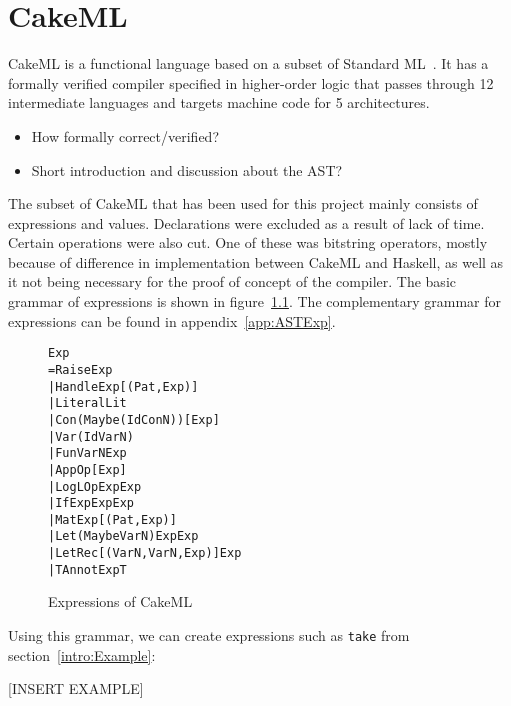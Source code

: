 \chapter{CakeML}

CakeML is a functional language based on a subset of
Standard ML~\cite{CakeML25:online}. It has a
formally verified compiler specified in higher-order logic that passes through
12 intermediate languages and targets machine code for 5 architectures.

\begin{itemize}
\item How formally correct/verified?
\item Short introduction and discussion about the AST?
\end{itemize}

The subset of CakeML that has been used for this project mainly
consists of expressions and values. Declarations were excluded as a result of
lack of time. Certain operations were also cut. One of these was bitstring
operators, mostly because of difference in implementation between CakeML
and Haskell, as well as it not being necessary for the proof of concept of
the compiler.
The basic grammar of expressions is shown in figure~\ref{CakeExp}. The
complementary grammar for expressions can be found in appendix~\ref{app:ASTExp}.

\begin{figure}
\begin{alltt}
Exp
  = Raise Exp
  | Handle Exp [(Pat, Exp)]
  | Literal Lit
  | Con (Maybe (Id ConN)) [Exp]
  | Var (Id VarN)
  | Fun VarN Exp
  | App Op [Exp]
  | Log LOp Exp Exp
  | If Exp Exp Exp
  | Mat Exp [(Pat, Exp)]
  | Let (Maybe VarN) Exp Exp
  | LetRec [(VarN, VarN, Exp)] Exp
  | TAnnot Exp T
\end{alltt}
\caption{Expressions of CakeML}
\label{CakeExp}
\end{figure}

\noindent Using this grammar, we can create expressions such as \texttt{take} from
section~\ref{intro:Example}:

[INSERT EXAMPLE]

